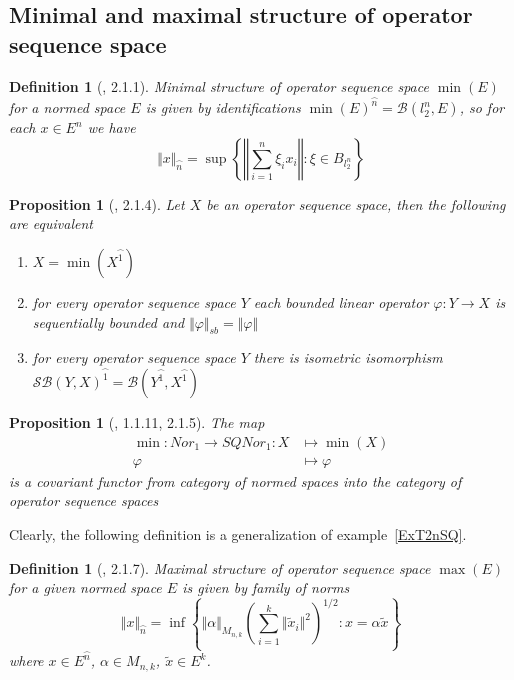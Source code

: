 \documentclass[12pt]{article}
\newtheorem{proposition}[theorem]{Proposition}
\newtheorem{definition}[theorem]{Definition}
\begin{document}
\subsection{Minimal and maximal structure of operator sequence space}

\begin{definition}[\cite{LamOpFolgen}, 2.1.1]\label{DefSQMin} 
Minimal structure of operator sequence space $\min(E)$ 
for a normed space $E$ is given by 
identifications ${\min(E)}^{\wideparen{n}} = \mathcal{B}(l_2^n, E)$, 
so for each $x \in E^n$ we have
$$
\Vert x\Vert_{\wideparen{n}}=\sup\left \{\left\Vert\sum\limits_{i=1}^n \xi_i
x_i\right\Vert:\xi\in B_{l_2^n}\right \}
$$
\end{definition}

\begin{proposition}[\cite{LamOpFolgen}, 2.1.4]\label{PrCharMinSQ}
Let $X$ be an operator sequence space, then the following are equivalent
\begin{enumerate}[label = (\roman*)]
    \item $X=\min(X^{\wideparen{1}})$

    \item for every operator sequence space 
    $Y$ each bounded linear operator $\varphi:Y\to X$ 
    is sequentially bounded and $\Vert\varphi\Vert_{sb}=\Vert\varphi\Vert$

    \item for every operator sequence space 
    $Y$ there is isometric isomorphism 
    ${\mathcal{SB}(Y,X)}^{\wideparen{1}}
    =\mathcal{B}(Y^{\wideparen{1}},X^{\wideparen{1}})$
\end{enumerate}
\end{proposition}

\begin{proposition}[\cite{LamOpFolgen}, 1.1.11, 2.1.5]\label{PrMinFucntor}
The map
$$
\begin{aligned}
\min : Nor_1 \to SQNor_1 : X&\mapsto \min(X)\\
\varphi&\mapsto\varphi
\end{aligned}
$$
is a covariant functor from category of normed spaces 
into the category of operator sequence spaces
\end{proposition}

Clearly, the following definition is a generalization of example~\ref{ExT2nSQ}.

\begin{definition}[\cite{LamOpFolgen}, 2.1.7]\label{DefSQMax} 
Maximal structure of operator sequence space $\max(E)$ 
for a given normed space $E$ is given by family of norms
$$
\Vert
x\Vert_{\wideparen{n}}
=\inf\left \{\Vert\alpha\Vert_{M_{n,k}}{\left(
    \sum\limits_{i=1}^k\Vert \tilde x_i\Vert^2
\right)}^{1/2}:x=\alpha\tilde x
\right \}
$$
where $x\in E^{\wideparen{n}}$, $\alpha\in M_{n,k}$, $\tilde{x}\in E^k$.
\end{definition}
\end{document}
